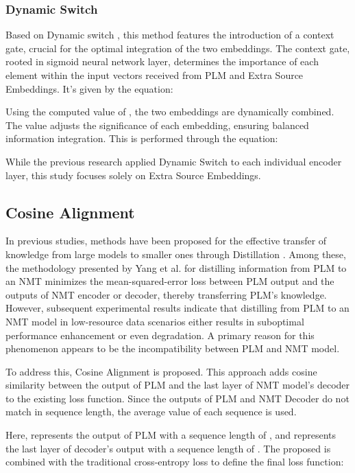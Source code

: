\documentclass[conference]{IEEEtran}
\begin{document}
\subsubsection{Dynamic Switch}
Based on Dynamic switch \cite{Yang2019}, this method features the introduction of a context gate, crucial for the optimal integration of the two embeddings. The context gate, rooted in sigmoid neural network layer, determines the importance of each element within the input vectors received from PLM and Extra Source Embeddings. It's given by the equation:

Using the computed value of , the two embeddings are dynamically combined. The value  adjusts the significance of each embedding, ensuring balanced information integration. This is performed through the equation:

While the previous research \cite{Yang2019} applied Dynamic Switch to each individual encoder layer, this study focuses solely on Extra Source Embeddings.

\subsection{Cosine Alignment}
In previous studies, methods have been proposed for the effective transfer of knowledge from large models to smaller ones through Distillation \cite{Hinton2015, Yang2019, weng2020acquiring}. Among these, the methodology presented by Yang et al. \cite{Yang2019} for distilling information from PLM to an NMT minimizes the mean-squared-error loss between PLM output and the outputs of NMT encoder or decoder, thereby transferring PLM's knowledge. However, subsequent experimental results indicate that distilling from PLM to an NMT model in low-resource data scenarios either results in suboptimal performance enhancement or even degradation. A primary reason for this phenomenon appears to be the incompatibility between PLM and NMT model.

To address this, Cosine Alignment is proposed. This approach adds cosine similarity between the output of PLM and the last layer of NMT model's decoder to the existing loss function. Since the outputs of PLM and NMT Decoder do not match in sequence length, the average value of each sequence is used.




Here,  represents the output of PLM with a sequence length of , and  represents the last layer of decoder's output with a sequence length of . The proposed  is combined with the traditional cross-entropy loss  to define the final loss function:
\end{document}
